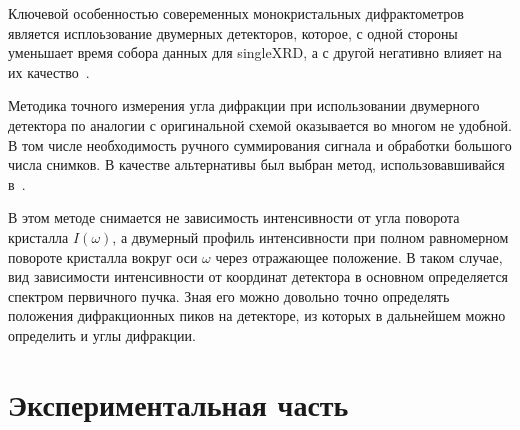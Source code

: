 \documentclass[a4paper, 12pt]{article}
\begin{document}
Ключевой особенностью совеременных монокристальных дифрактометров является исплоьзование двумерных детекторов, которое, с одной стороны уменьшает время собора данных для \gls{singleXRD}, а с другой негативно влияет на их качество~\cite{Dudka:2017}.

Методика точного измерения угла дифракции при использовании двумерного детектора по аналогии с оригинальной схемой оказывается во многом не удобной.
В том числе необходимость ручного суммирования сигнала и обработки большого числа снимков.
В качестве альтернативы был выбран метод, использовавшивайся в~\cite{Serebrennikova:2021}.

В этом методе снимается не зависимость интенсивности от угла поворота кристалла $I(\omega)$, а двумерный профиль интенсивности при полном равномерном повороте кристалла вокруг оси $\omega$ через отражающее положение.
В таком случае, вид зависимости интенсивности от координат детектора в основном определяется спектром первичного пучка.
Зная его можно довольно точно определять положения дифракционных пиков на детекторе, из которых в дальнейшем можно определить и углы дифракции.
\section{Экспериментальная часть}
\end{document}
